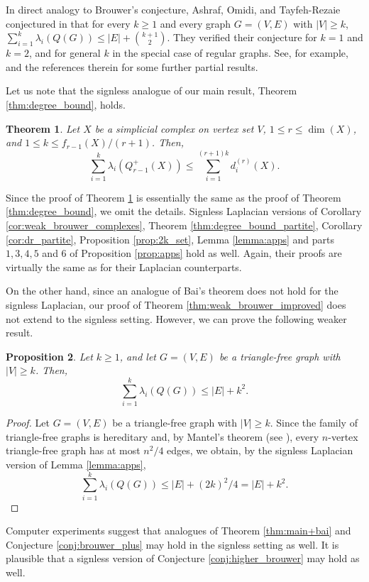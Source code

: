 \documentclass[a4paper,11pt]{article}
\theoremstyle{plain}
\newtheorem{theorem}{\bf Theorem}
\newtheorem{proposition}[theorem]{\bf Proposition}
\theoremstyle{definition}
\numberwithin{theorem}{section}
\numberwithin{equation}{section}
\begin{document}
In direct analogy to Brouwer's conjecture, Ashraf, Omidi, and Tayfeh-Rezaie conjectured in \cite{ashraf2013onthesum} that for every $k\ge 1$ and every graph $G=(V,E)$ with $|V|\ge k$, $\sum_{i=1}^k \lambda_i(Q(G))\le |E|+\binom{k+1}{2}$. They verified their conjecture for $k=1$ and $k=2$, and for general $k$ in the special case of regular graphs. See, for example, \cite{yang2014onaconjecture,chen2018note2,pirzada2024kyfan, zhou2024onthesum} and the references therein for some further partial results.

Let us note that the signless analogue of our main result, Theorem \ref{thm:degree_bound}, holds.

\begin{theorem}\label{thm:degree_bound_signless}
      Let $X$ be a simplicial complex on vertex set $V$, $1\le r\le \dim(X)$, and $1\le k\le f_{r-1}(X)/(r+1)$. Then,
    \[
        \sum_{i=1}^k \lambda_i(Q_{r-1}^{+}(X))\le \sum_{i=1}^{(r+1)k} d^{(r)}_i(X).
    \]
\end{theorem}
Since the proof of Theorem \ref{thm:degree_bound_signless} is essentially the same as the proof of Theorem \ref{thm:degree_bound}, we omit the details. Signless Laplacian versions of Corollary \ref{cor:weak_brouwer_complexes}, Theorem \ref{thm:degree_bound_partite}, Corollary \ref{cor:dr_partite},
Proposition \ref{prop:2k_set}, Lemma \ref{lemma:apps} and parts $1,3,4,5$ and $6$ of Proposition \ref{prop:apps} hold as well. Again, their proofs are virtually the same as for their Laplacian counterparts.

On the other hand, since an analogue of Bai's theorem does not hold for the signless Laplacian, our proof of Theorem \ref{thm:weak_brouwer_improved} does not extend to the signless setting. However, we can prove the following weaker result.
\begin{proposition}
    Let $k\ge 1$, and let $G=(V,E)$ be a triangle-free graph with $|V|\ge k$. Then,
    \[
        \sum_{i=1}^k \lambda_i(Q(G))\le |E|+k^2.
    \]
\end{proposition}
\begin{proof}
    Let $G=(V,E)$ be a triangle-free graph with $|V|\ge k$. 
    Since the family of triangle-free graphs is hereditary and, by Mantel's theorem (see \cite[Chapter I, Theorem 2]{bollobas1998modern}),  every $n$-vertex triangle-free graph has at most $n^2/4$ edges, we obtain, by the signless Laplacian version of Lemma \ref{lemma:apps},
    \[
         \sum_{i=1}^k \lambda_i(Q(G))\le |E|+ (2k)^2/4= |E|+k^2.
    \]
\end{proof}


Computer experiments suggest that analogues of Theorem \ref{thm:main+bai} and Conjecture \ref{conj:brouwer_plus} may hold in the signless setting as well. It is plausible that a signless version of Conjecture \ref{conj:higher_brouwer} may hold as well.





\end{document}
